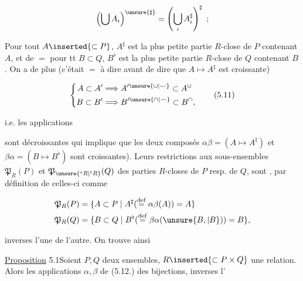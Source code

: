 
\[
 \left(\bigcup A_i\right)^{\unsure{\sharp}}=\left(\bigcup_i A_i^\sharp\right)^\sharp\ ;
\]

Pour tout $A\inserted{\subset P}$, $A^\sharp$ est la plus petite partie $R$-close de $P$ contenant $A$, et de $=$ pour tt $B\subset Q$, $B^\flat$ est la plus petite partie $R$-close de $Q$ contenant $B$. On a de plus (c'était $=$ à dire avant de dire que $A\mapsto A^\sharp$ est croissante)

\[
\left\{\begin{aligned}
 A\subset A'&\Longrightarrow A'^{\unsure{\cup|\smile}}\subset A^\cup\\
 B\subset B'&\Longrightarrow B'^{\unsure{\cap|\frown}}\subset B^\cap,
\end{aligned}\right.
\tag*{(5.11)}
\]

i.e. les applications


sont décroissantes  qui implique que les deux composés $\alpha\beta=(A\mapsto A^\sharp)$ et $\beta\alpha=(B\mapsto B^\flat)$ sont croissantes). Leurs restrictions aux sous-ensembles $\mathfrak P_R(P)$ et $\mathfrak P_{\unsure{{}^{s}R|{}^{t}R}}(Q)$ des parties $R$-closes de $P$ resp. de $Q$, sont , par définition de celles-ci comme

\[
\begin{aligned}
 \mathfrak P_R(P)&=\{A\subset P\mid A^\sharp(\overset{\mathrm{def}}{=}\alpha\beta(A))=A\}\\
 \mathfrak P_R(Q)&=\{B\subset Q\mid B^\flat(\overset{\mathrm{def}}{=}\beta\alpha(\unsure{B,|B}))=B\},
\end{aligned}
\]

inverses l'une de l'autre. On trouve ainsi

\uline{Proposition} 5.1\quad Soient $P,Q$ deux ensembles, $R\inserted{\subset P\times Q}$ une relation. Alors les applications $\alpha,\beta$ de (5.12.)  des bijections, inverses l' 
